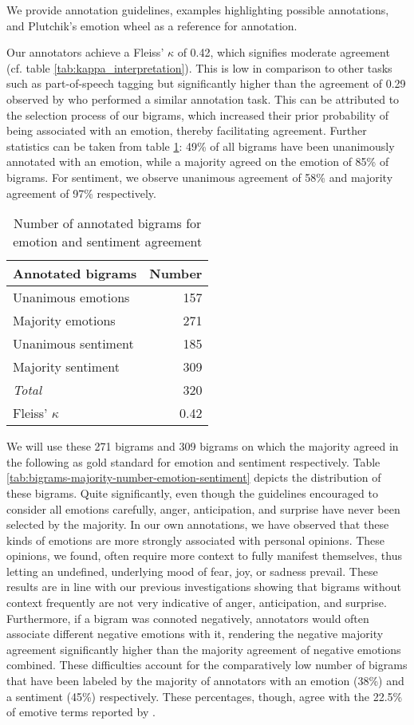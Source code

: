 We provide annotation guidelines, examples highlighting possible annotations, and Plutchik's emotion wheel as a reference for annotation.

Our annotators achieve a Fleiss' $\kappa$ of 0.42, which signifies moderate agreement \cite{kappa} (cf. table \ref{tab:kappa_interpretation}). This is low in comparison to other tasks such as part-of-speech tagging but significantly higher than the agreement of 0.29 observed by \citeauthor{nrc} who performed a similar annotation task. This can be attributed to the selection process of our bigrams, which increased their prior probability of being associated with an emotion, thereby facilitating agreement. Further statistics can be taken from table \ref{tab:annotation-bigrams}: 49\% of all bigrams have been unanimously annotated with an emotion, while a majority agreed on the emotion of 85\% of bigrams. For sentiment, we observe unanimous agreement of 58\% and majority agreement of 97\% respectively.

\begin{table}
\centering
\begin{tabular}{l|r}
\textbf{Annotated bigrams} & \textbf{Number}\\\hline
Unanimous emotions & 157\\
Majority emotions & 271\\
Unanimous sentiment & 185\\
Majority sentiment & 309\\\hline
\textit{Total} & 320\\\hline
Fleiss' $\kappa$ & 0.42
\end{tabular}
\caption{Number of annotated bigrams for emotion and sentiment agreement}
\label{tab:annotation-bigrams}
\end{table}

We will use these 271 bigrams and 309 bigrams on which the majority agreed in the following as gold standard for emotion and sentiment respectively. Table \ref{tab:bigrams-majority-number-emotion-sentiment} depicts the distribution of these bigrams. Quite significantly, even though the guidelines encouraged to consider all emotions carefully, anger, anticipation, and surprise have never been selected by the majority. In our own annotations, we have observed that these kinds of emotions are more strongly associated with personal opinions. These opinions, we found, often require more context to fully manifest themselves, thus letting an undefined, underlying mood of fear, joy, or sadness prevail. These results are in line with our previous investigations showing that bigrams without context frequently are not very indicative of anger, anticipation, and surprise. Furthermore, if a bigram was connoted negatively, annotators would often associate different negative emotions with it, rendering the negative majority agreement significantly higher than the majority agreement of negative emotions combined. These difficulties account for the comparatively low number of bigrams that have been labeled by the majority of annotators with an emotion (38\%) and a sentiment (45\%) respectively. These percentages, though, agree with the 22.5\% of emotive terms reported by \citeauthor{nrc}.

